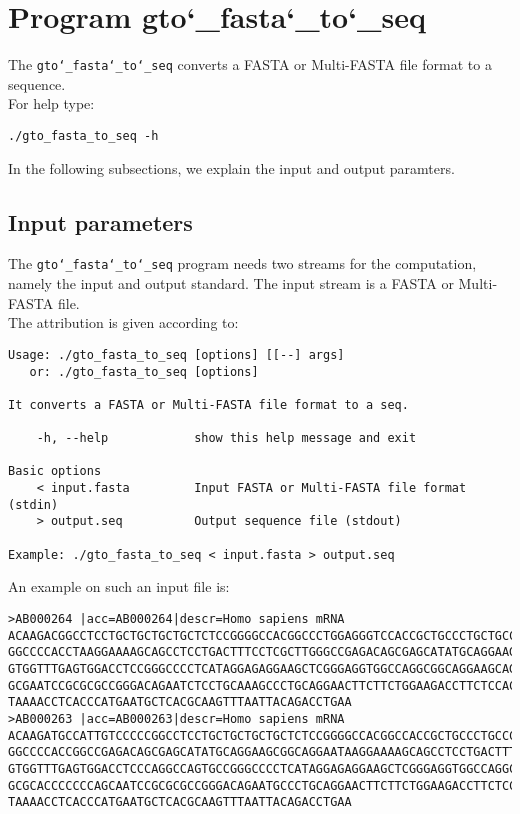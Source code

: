 \section{Program gto\char`_fasta\char`_to\char`_seq}
The \texttt{gto\char`_fasta\char`_to\char`_seq} converts a FASTA or Multi-FASTA file format to a sequence.\\
For help type:
\begin{lstlisting}
./gto_fasta_to_seq -h
\end{lstlisting}
In the following subsections, we explain the input and output paramters.

\subsection*{Input parameters}

The \texttt{gto\char`_fasta\char`_to\char`_seq} program needs two streams for the computation,
namely the input and output standard. The input stream is a FASTA or Multi-FASTA file.\\
The attribution is given according to:
\begin{lstlisting}
Usage: ./gto_fasta_to_seq [options] [[--] args]
   or: ./gto_fasta_to_seq [options]

It converts a FASTA or Multi-FASTA file format to a seq.

    -h, --help            show this help message and exit

Basic options
    < input.fasta         Input FASTA or Multi-FASTA file format (stdin)
    > output.seq          Output sequence file (stdout)

Example: ./gto_fasta_to_seq < input.fasta > output.seq
\end{lstlisting}
An example on such an input file is:
\begin{lstlisting}
>AB000264 |acc=AB000264|descr=Homo sapiens mRNA 
ACAAGACGGCCTCCTGCTGCTGCTGCTCTCCGGGGCCACGGCCCTGGAGGGTCCACCGCTGCCCTGCTGCCATTGTCCCC
GGCCCCACCTAAGGAAAAGCAGCCTCCTGACTTTCCTCGCTTGGGCCGAGACAGCGAGCATATGCAGGAAGCGGCAGGAA
GTGGTTTGAGTGGACCTCCGGGCCCCTCATAGGAGAGGAAGCTCGGGAGGTGGCCAGGCGGCAGGAAGCAGGCCAGTGCC
GCGAATCCGCGCGCCGGGACAGAATCTCCTGCAAAGCCCTGCAGGAACTTCTTCTGGAAGACCTTCTCCACCCCCCCAGC
TAAAACCTCACCCATGAATGCTCACGCAAGTTTAATTACAGACCTGAA
>AB000263 |acc=AB000263|descr=Homo sapiens mRNA 
ACAAGATGCCATTGTCCCCCGGCCTCCTGCTGCTGCTGCTCTCCGGGGCCACGGCCACCGCTGCCCTGCCCCTGGAGGGT
GGCCCCACCGGCCGAGACAGCGAGCATATGCAGGAAGCGGCAGGAATAAGGAAAAGCAGCCTCCTGACTTTCCTCGCTTG
GTGGTTTGAGTGGACCTCCCAGGCCAGTGCCGGGCCCCTCATAGGAGAGGAAGCTCGGGAGGTGGCCAGGCGGCAGGAAG
GCGCACCCCCCCAGCAATCCGCGCGCCGGGACAGAATGCCCTGCAGGAACTTCTTCTGGAAGACCTTCTCCTCCTGCAAA
TAAAACCTCACCCATGAATGCTCACGCAAGTTTAATTACAGACCTGAA
\end{lstlisting}

